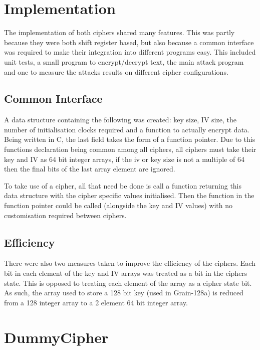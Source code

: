 \documentclass{report}
\let\Oldsection\section
\renewcommand{\section}{\FloatBarrier\Oldsection}
\let\Oldsubsection\subsection
\renewcommand{\subsection}{\FloatBarrier\Oldsubsection}
\begin{document}
\section{Implementation}
The implementation of both ciphers shared many features. This was partly because they were both shift register based, but also because a common interface was required to make their integration into different programs easy. This included unit tests, a small program to encrypt/decrypt text, the main attack program and one to measure the attacks results on different cipher configurations.

\subsection{Common Interface}
A data structure containing the following was created: key size, IV size, the number of initialisation clocks required and a function to actually encrypt data. Being written in C, the last field takes the form of a function pointer. Due to this functions declaration being common among all ciphers, all ciphers must take their key and IV as 64 bit integer arrays, if the iv or key size is not a multiple of 64 then the final bits of the last array element are ignored.

To take use of a cipher, all that need be done is call a function returning this data structure with the cipher specific values initialised. Then the function in the function pointer could be called (alongside the key and IV values) with no customisation required between ciphers.

\subsection{Efficiency}

There were also two measures taken to improve the efficiency of the ciphers. Each bit in each element of the key and IV arrays was treated as a bit in the ciphers state. This is opposed to treating each element of the array as a cipher state bit. As such, the array used to store a 128 bit key (used in Grain-128a) is reduced from a 128 integer array to a 2 element 64 bit integer array.

\begin{figure}[!htb]
\end{figure}
\newpage
\section{DummyCipher}
\begin{figure}[!htb]
\end{figure}
\end{document}
